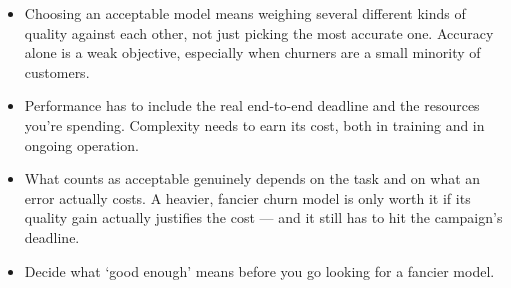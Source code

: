 \documentclass[11pt,a4paper]{article}
\begin{document}
\begin{examplebox}[title after break={SPOKEN SCRIPT --- slide 46 continued}]
\begin{itemize}
\item Choosing an acceptable model means weighing several different kinds of quality against each other, not just picking the most accurate one. Accuracy alone is a weak objective, especially when churners are a small minority of customers.
\item Performance has to include the real end-to-end deadline and the resources you're spending. Complexity needs to earn its cost, both in training and in ongoing operation.
\item What counts as acceptable genuinely depends on the task and on what an error actually costs. A heavier, fancier churn model is only worth it if its quality gain actually justifies the cost — and it still has to hit the campaign's deadline.
\item Decide what ‘good enough’ means before you go looking for a fancier model.
\end{itemize}
\end{examplebox}
\par\noindent{\scriptsize\textcolor{teal!60!black}{Reading anchor: Bucaioni, published Table 1, pp. 6–7 · Bass, Ch. 14 · Kalinowski, §13.4}}
\clearpage
\end{document}
